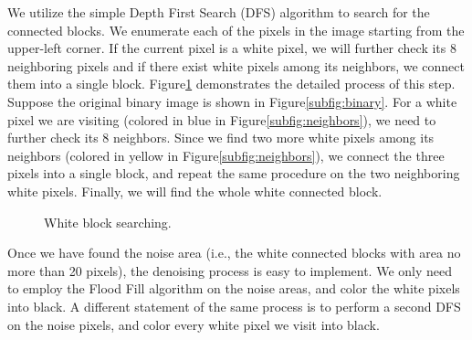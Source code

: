 \documentclass{article}
\begin{document}
We utilize the simple Depth First Search (DFS) algorithm to search for the connected blocks. We enumerate each of the pixels in the image starting from the upper-left corner. If the current pixel is a white pixel, we will further check its 8 neighboring pixels and if there exist white pixels among its neighbors, we connect them into a single block. Figure\ref{fig:DFS} demonstrates the detailed process of this step. Suppose the original binary image is shown in Figure\ref{subfig:binary}. For a white pixel we are visiting (colored in blue in Figure\ref{subfig:neighbors}), we need to further check its 8 neighbors. Since we find two more white pixels among its neighbors (colored in yellow in Figure\ref{subfig:neighbors}), we connect the three pixels into a single block, and repeat the same procedure on the two neighboring white pixels. Finally, we will find the whole white connected block. 

\begin{figure}[!htb]
	\centering
	\hspace{.2in}
	\caption{White block searching.}
	\label{fig:DFS}
\end{figure}

Once we have found the noise area (i.e., the white connected blocks with area no more than 20 pixels), the denoising process is easy to implement. We only need to employ the Flood Fill algorithm on the noise areas, and color the white pixels into black. A different statement of the same process is to perform a second DFS on the noise pixels, and color every white pixel we visit into black. 
\end{document}
